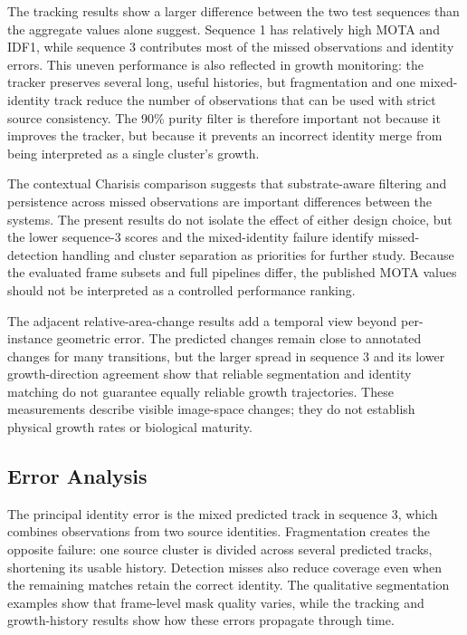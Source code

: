 \documentclass[11pt,a4paper]{article}
\begin{document}
The tracking results show a larger difference between the two test sequences than the aggregate values alone suggest. Sequence 1 has relatively high MOTA and IDF1, while sequence 3 contributes most of the missed observations and identity errors. This uneven performance is also reflected in growth monitoring: the tracker preserves several long, useful histories, but fragmentation and one mixed-identity track reduce the number of observations that can be used with strict source consistency. The 90\% purity filter is therefore important not because it improves the tracker, but because it prevents an incorrect identity merge from being interpreted as a single cluster's growth.

The contextual Charisis comparison suggests that substrate-aware filtering and persistence across missed observations are important differences between the systems. The present results do not isolate the effect of either design choice, but the lower sequence-3 scores and the mixed-identity failure identify missed-detection handling and cluster separation as priorities for further study. Because the evaluated frame subsets and full pipelines differ, the published MOTA values should not be interpreted as a controlled performance ranking.

The adjacent relative-area-change results add a temporal view beyond per-instance geometric error. The predicted changes remain close to annotated changes for many transitions, but the larger spread in sequence 3 and its lower growth-direction agreement show that reliable segmentation and identity matching do not guarantee equally reliable growth trajectories. These measurements describe visible image-space changes; they do not establish physical growth rates or biological maturity.

\subsection{Error Analysis}

The principal identity error is the mixed predicted track in sequence 3, which combines observations from two source identities. Fragmentation creates the opposite failure: one source cluster is divided across several predicted tracks, shortening its usable history. Detection misses also reduce coverage even when the remaining matches retain the correct identity. The qualitative segmentation examples show that frame-level mask quality varies, while the tracking and growth-history results show how these errors propagate through time.
\end{document}
